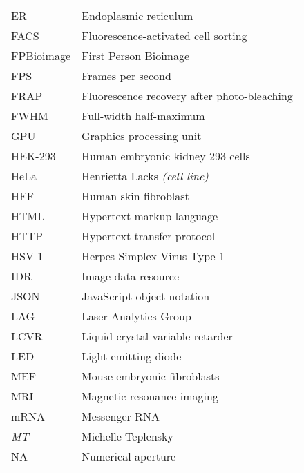 \begin{flushleft}
\begin{longtable}[l]{|p{5.5em}|p{25em}|}
ER         & Endoplasmic reticulum                                      \\
FACS       & Fluorescence-activated cell sorting                        \\
FPBioimage & First Person Bioimage                                      \\
FPS        & Frames per second                                          \\
FRAP       & Fluorescence recovery after photo-bleaching                \\
FWHM       & Full-width half-maximum                                    \\
GPU        & Graphics processing unit                                   \\
HEK-293    & Human embryonic kidney 293 cells                           \\
HeLa       & Henrietta Lacks \textit{(cell line)}                                \\
HFF        & Human skin fibroblast                                      \\
HTML       & Hypertext markup language                                  \\
HTTP       & Hypertext transfer protocol                                \\
HSV-1			 & Herpes Simplex Virus Type 1															  \\
IDR        & Image data resource                                        \\
JSON       & JavaScript object notation                                 \\
LAG        & Laser Analytics Group                                      \\
LCVR       & Liquid crystal variable retarder                           \\
LED        & Light emitting diode                                       \\
MEF        & Mouse embryonic fibroblasts                                \\
MRI        & Magnetic resonance imaging                                \\
mRNA       & Messenger RNA                                              \\
\textit{MT} & Michelle Teplensky                                         \\
NA         & Numerical aperture                                         \\

\end{longtable}
\end{flushleft}
